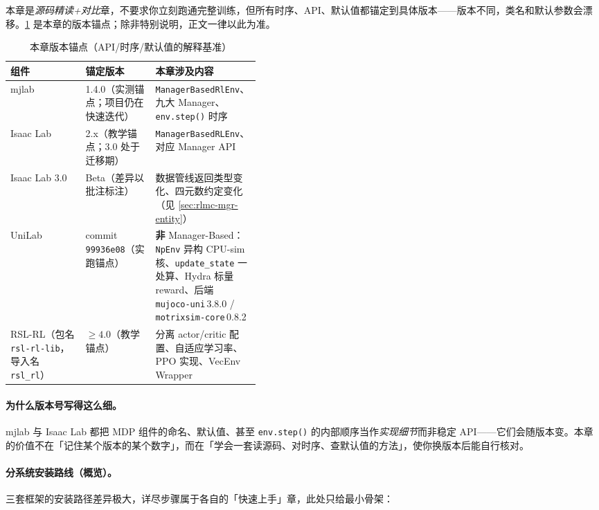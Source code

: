 本章是\emph{源码精读+对比}章，不要求你立刻跑通完整训练，但所有时序、API、默认值都锚定到具体版本——版本不同，类名和默认参数会漂移。\cref{tab:rlmc-mgr-versions} 是本章的版本锚点；除非特别说明，正文一律以此为准。

\begin{table}[ht]
\centering
\caption{本章版本锚点（API/时序/默认值的解释基准）}
\label{tab:rlmc-mgr-versions}
\small
\begin{tabular}{@{}llp{0.42\linewidth}@{}}
\toprule
组件 & 锚定版本 & 本章涉及内容 \\
\midrule
mjlab & 1.4.0（实测锚点；项目仍在快速迭代） & \verb|ManagerBasedRlEnv|、九大 Manager、\verb|env.step()| 时序 \\
Isaac Lab & 2.x（教学锚点；3.0 处于迁移期） & \verb|ManagerBasedRLEnv|、对应 Manager API \\
Isaac Lab 3.0 & Beta（差异以批注标注） & 数据管线返回类型变化、四元数约定变化（见 \cref{sec:rlmc-mgr-entity}） \\
UniLab & commit \texttt{99936e08}（实跑锚点） & \textbf{非} Manager-Based：\texttt{NpEnv} 异构 CPU-sim 核、\texttt{update\_state} 一处算、Hydra 标量 reward、后端 \texttt{mujoco-uni}\,3.8.0 / \texttt{motrixsim-core}\,0.8.2 \\
RSL-RL（包名 \texttt{rsl-rl-lib}，导入名 \texttt{rsl\_rl}） & $\ge 4.0$（教学锚点） & 分离 actor/critic 配置、自适应学习率、PPO 实现、VecEnv Wrapper \\
\bottomrule
\end{tabular}
\end{table}

\paragraph{为什么版本号写得这么细。}mjlab 与 Isaac Lab 都把 MDP 组件的命名、默认值、甚至 \verb|env.step()| 的内部顺序当作\emph{实现细节}而非稳定 API——它们会随版本变。本章的价值不在「记住某个版本的某个数字」，而在「学会一套读源码、对时序、查默认值的方法」，使你换版本后能自行核对。

\paragraph{分系统安装路线（概览）。}三套框架的安装路径差异极大，详尽步骤属于各自的「快速上手」章，此处只给最小骨架：

